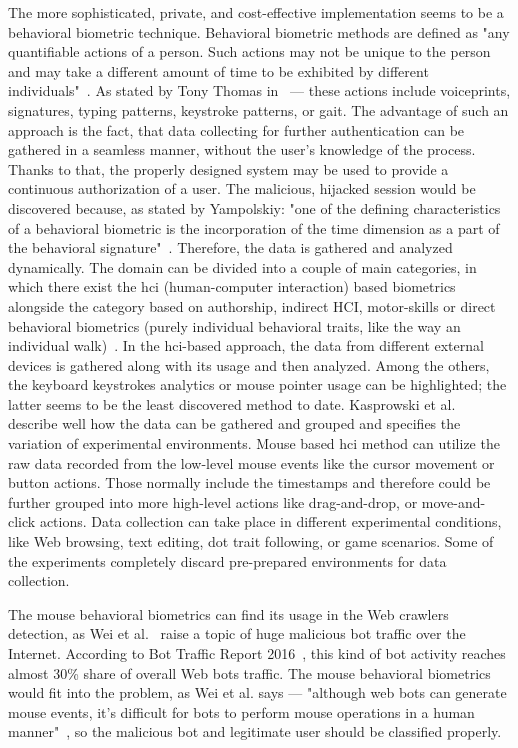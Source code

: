 The more sophisticated, private, and cost-effective implementation seems to be a behavioral biometric technique.
Behavioral biometric methods are defined as "any quantifiable actions of a person.
Such actions may not be unique to the person and may take a different amount of time to be exhibited by different individuals"~\cite{Yampolskiy2011}.
As stated by Tony Thomas in~\cite{thomas2020machine} --- these actions include voiceprints, signatures, typing patterns, keystroke patterns, or gait.
The advantage of such an approach is the fact, that data collecting for further authentication can be gathered in a seamless manner, without the user's knowledge of the process.
Thanks to that, the properly designed system may be used to provide a continuous authorization of a user.
The malicious, hijacked session would be discovered because, as stated by Yampolskiy: "one of the defining characteristics of a behavioral biometric is the incorporation of the time dimension as a part of the behavioral signature"~\cite{Yampolskiy2011}.
Therefore, the data is gathered and analyzed dynamically.
The domain can be divided into a couple of main categories, in which there exist the \gls{hci} (human-computer interaction) based biometrics alongside the category based on authorship, indirect HCI, motor-skills or direct behavioral biometrics (purely individual behavioral traits, like the way an individual walk)~\cite{Yampolskiy2011}.
In the \gls{hci}-based approach, the data from different external devices is gathered along with its usage and then analyzed.
Among the others, the keyboard keystrokes analytics or mouse pointer usage can be highlighted; the latter seems to be the least discovered method to date.
Kasprowski et al.~\cite{kasprowski2018fusion} describe well how the data can be gathered and grouped and specifies the variation of experimental environments.
Mouse based \gls{hci} method can utilize the raw data recorded from the low-level mouse events like the cursor movement or button actions.
Those normally include the timestamps and therefore could be further grouped into more high-level actions like drag-and-drop, or move-and-click actions.
Data collection can take place in different experimental conditions, like Web browsing, text editing, dot trait following, or game scenarios.
Some of the experiments completely discard pre-prepared environments for data collection.

The mouse behavioral biometrics can find its usage in the Web crawlers detection, as Wei et al.~\cite{a-deep-learning-approach-to-web-bot-detection-using-mouse-behavioral-biometrics} raise a topic of huge malicious bot traffic over the Internet.
According to Bot Traffic Report 2016~\cite{bot-share-2016}, this kind of bot activity reaches almost 30\% share of overall Web bots traffic.
The mouse behavioral biometrics would fit into the problem, as Wei et al. says --- "although web bots can generate mouse events, it’s difficult for bots to perform mouse operations in a human manner"~\cite{a-deep-learning-approach-to-web-bot-detection-using-mouse-behavioral-biometrics}, so the malicious bot and legitimate user should be classified properly.